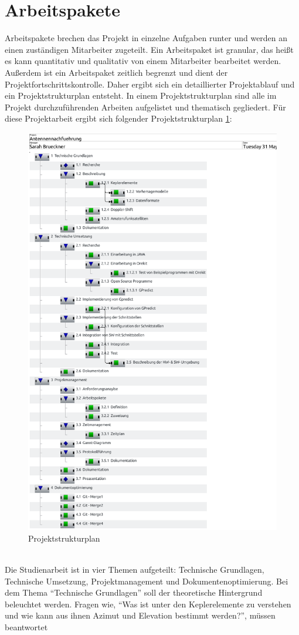 \section{Arbeitspakete}
Arbeitspakete brechen das Projekt in einzelne Aufgaben runter und werden an einen 
zuständigen Mitarbeiter zugeteilt. Ein Arbeitspaket ist granular, das heißt es kann quantitativ und 
qualitativ von einem Mitarbeiter bearbeitet werden. Außerdem ist ein Arbeitspaket zeitlich begrenzt 
und dient der Projektfortschrittskontrolle. 
Daher ergibt sich ein detaillierter Projektablauf und ein Projektstrukturplan entsteht. In einem 
Projektstrukturplan sind alle im Projekt durchzuführenden Arbeiten aufgelistet und thematisch 
gegliedert. Für diese Projektarbeit ergibt sich folgender Projektstrukturplan 
\ref{fig:projektstruktur}:\\
\begin{figure}[h]
 \centering
\includegraphics[width=0.6\linewidth]{./images/Tasks}
\caption{Projektstrukturplan}
 \label{fig:projektstruktur}
\end{figure}
\\
Die Studienarbeit ist in vier Themen aufgeteilt: Technische Grundlagen, Technische Umsetzung, 
Projektmanagement und Dokumentenoptimierung. Bei dem Thema ``Technische Grundlagen'' soll der 
theoretische Hintergrund beleuchtet werden. Fragen wie, ``Was ist unter den Keplerelemente zu 
verstehen und wie kann aus ihnen Azimut und Elevation bestimmt werden?'', müssen beantwortet 
